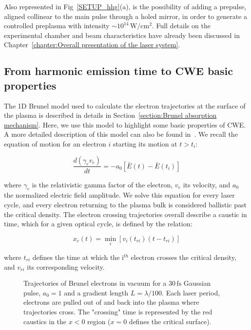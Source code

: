 \noindent Also represented in Fig~\ref{SETUP_hhg}(a), is the possibility of adding  a prepulse, aligned collinear to the main pulse through a holed mirror, in order to generate a controlled preplasma with intensity $\sim 10^{14}\,\mathrm{W/cm^2}$. Full details on the experimental chamber and 
beam characteristics have already been discussed in Chapter~\ref{chapter:Overall presentation of the laser system}.


\subsection{From harmonic emission time to CWE basic properties}\label{subsection:CWE emission time}

The 1D  Brunel model used to calculate the electron trajectories at the surface of the plasma is described in details in Section~\ref{section:Brunel absorption mechanism}. Here, we use this model to highlight some basic properties of CWE.
A more detailed description of this model can also be found in~\cite{TheseArnaud,TheseCedric}. We recall the equation of motion for an electron $i$ starting its motion at $t >t_i$:

\begin{equation}
\frac{d(\gamma_e v_e)}{dt} = -a_0[\bar{E}(t)-\bar{E}(t_i)]
\label{electron_i_equation}
\end{equation}

\noindent where $\gamma_e$ is the relativistic gamma factor of the electron, $v_e$ its velocity, and $a_0$ the normalized electric field amplitude. We solve this equation for every laser cycle, and every electron returning to the plasma bulk is considered ballistic past the critical density. The electron crossing trajectories overall describe a caustic in time, which for a given optical cycle, is defined by the relation:

\begin{equation}
x_c(t) = \min_{i} [v_i(t_{ri})(t-t_{ri})]
\end{equation}

\noindent where $t_{ri}$ defines the time at which the i$^{th}$ electron crosses the critical density, and $v_{ri}$ its corresponding velocity. 

\begin{figure}[H]
\caption{\label{excursionsAndemissionCaustics} Trajectories of Brunel electrons in vacuum for a $30\,\mathrm{fs}$ Gaussian pulse, $a_0 = 1$ and a gradient length $L = \lambda/100$. Each laser period, electrons are pulled out of and back into the plasma where trajectories cross. The "crossing" time is represented by the red caustics in the $x<0$ region ($x=0$ defines the critical surface).}
\end{figure}

